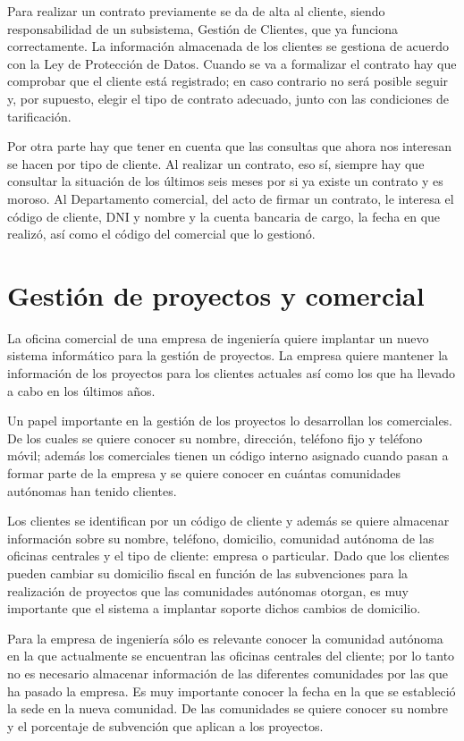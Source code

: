 \documentclass[a4paper]{article}
\begin{document}
Para realizar un contrato previamente se da de alta al cliente, siendo responsabilidad de un subsistema, Gestión de Clientes, que ya funciona correctamente. La información almacenada de los clientes se gestiona de acuerdo con la Ley de Protección de Datos. Cuando se va a formalizar el contrato hay que comprobar que el cliente está registrado; en caso contrario no será posible seguir y, por supuesto, elegir el tipo de contrato adecuado, junto con las condiciones de tarificación. 

Por otra parte hay que tener en cuenta que las consultas que ahora nos interesan se hacen por tipo de cliente. Al realizar un contrato, eso sí, siempre hay que consultar la situación de los últimos seis meses por si ya existe un contrato y es moroso. Al Departamento comercial, del acto de firmar un contrato, le interesa el código de cliente, DNI y nombre y la cuenta bancaria de cargo, la fecha en que realizó, así como el código del comercial que lo gestionó.

\section{Gestión de proyectos y comercial}
La oficina comercial de una empresa de ingeniería quiere implantar un nuevo sistema informático para la gestión de proyectos. La empresa quiere mantener la información de  los proyectos para los clientes actuales así como los que ha llevado a cabo en los últimos años. 

Un papel importante en la gestión de los proyectos lo desarrollan los comerciales. De los cuales se quiere conocer su nombre, dirección, teléfono fijo y teléfono móvil; además los comerciales tienen un código interno asignado cuando pasan a formar parte de la empresa y se quiere conocer en cuántas comunidades autónomas han tenido clientes.

Los clientes se identifican por un código de cliente y además se quiere almacenar información sobre su nombre, teléfono, domicilio, comunidad autónoma de las oficinas centrales y el tipo de cliente: empresa o particular. Dado que los clientes pueden cambiar su domicilio fiscal en función de las subvenciones para la realización de proyectos que las comunidades autónomas otorgan, es muy importante que el sistema a implantar soporte dichos cambios de domicilio.

Para la empresa de ingeniería sólo es relevante conocer la comunidad autónoma en la que actualmente se encuentran las oficinas centrales del cliente; por lo tanto no es necesario almacenar información de las diferentes comunidades por las que ha pasado la empresa. Es muy importante conocer la fecha en la que se estableció la sede en la nueva comunidad. De las comunidades se quiere conocer su nombre y el porcentaje de subvención que aplican a los proyectos.
\end{document}
